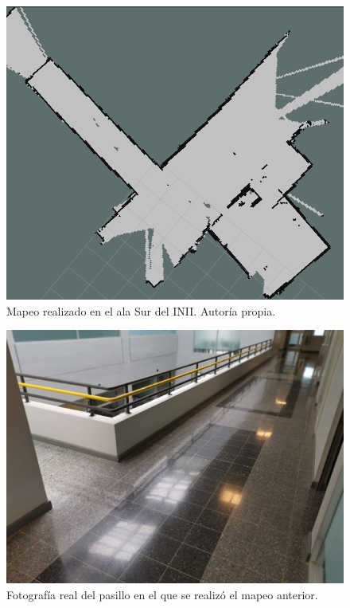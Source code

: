\begin{figure}
\centering
\includegraphics[scale=0.6]{imagenes/mapeo_ini_sur.png}
\caption{Mapeo realizado en el ala Sur del INII. Autoría propia.}
\end{figure}

\begin{figure}
\centering
\includegraphics[scale=0.5]{imagenes/pasillo_ini.jpg}
\caption{Fotografía real del pasillo en el que se realizó el mapeo anterior.}
\end{figure}

